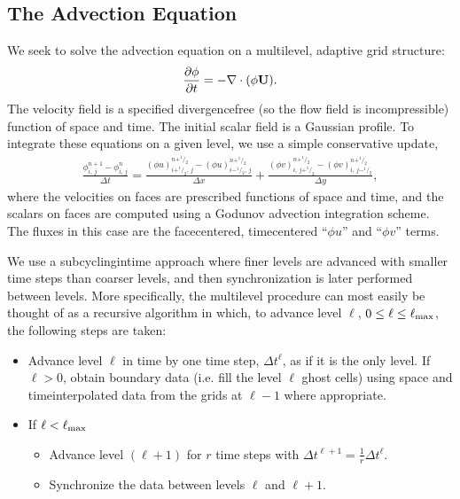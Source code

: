 \documentclass[letterpaper,10pt,english]{sphinxmanual}
\begin{document}
\subsection{The Advection Equation}
\label{\detokenize{AmrCore:the-advection-equation}}
\sphinxAtStartPar
We seek to solve the advection equation on a multi\sphinxhyphen{}level, adaptive grid structure:
\begin{equation*}
\begin{split}\frac{\partial\phi}{\partial t} = -\nabla\cdot(\phi{\bf U}).\end{split}
\end{equation*}
\sphinxAtStartPar
The velocity field is a specified divergence\sphinxhyphen{}free (so the flow field is incompressible)
function of space and time. The initial scalar field is a
Gaussian profile. To integrate these equations on a given level, we use a simple conservative update,
\begin{equation*}
\begin{split}\frac{\phi_{i,\,j}^{n+1}-\phi_{i,\,j}^n}{\Delta t} = \frac{(\phi u)_{i+^1\!/_2,\,j}^{n+^1\!/_2}-(\phi u)_{i-^1\!/_2,\,j}^{n+^1\!/_2}}{\Delta x} + \frac{(\phi v)_{i,\,j+^1\!/_2}^{n+^1\!/_2} - (\phi v)_{i,\,j-^1\!/_2}^{n+^1\!/_2}}{\Delta y},\end{split}
\end{equation*}
\sphinxAtStartPar
where the velocities on faces are prescribed functions of space and time, and the scalars on faces
are computed using a Godunov advection integration scheme. The fluxes in this case are the face\sphinxhyphen{}centered,
time\sphinxhyphen{}centered “\(\phi u\)” and “\(\phi v\)” terms.

\sphinxAtStartPar
We use a subcycling\sphinxhyphen{}in\sphinxhyphen{}time approach where finer levels are advanced with smaller
time steps than coarser levels, and then synchronization is later performed between levels.
More specifically, the multi\sphinxhyphen{}level procedure can most
easily be thought of as a recursive algorithm in which, to advance level \(\ell\),
\(0\le\ell\le\ell_{\rm max}\), the following steps are taken:
\begin{itemize}
\item {} 
\sphinxAtStartPar
Advance level \(\ell\) in time by one time step, \(\Delta t^{\ell}\), as if it is
the only level. If \(\ell>0\), obtain boundary data (i.e. fill the level \(\ell\) ghost cells)
using space\sphinxhyphen{} and time\sphinxhyphen{}interpolated data from the grids at \(\ell-1\) where appropriate.

\item {} 
\sphinxAtStartPar
If \(\ell<\ell_{\rm max}\)
\begin{itemize}
\item {} 
\sphinxAtStartPar
Advance level \((\ell+1)\) for \(r\) time steps with \(\Delta t^{\ell+1} = \frac{1}{r}\Delta t^{\ell}\).

\item {} 
\sphinxAtStartPar
Synchronize the data between levels \(\ell\) and \(\ell+1\).

\end{itemize}

\end{itemize}
\end{document}
